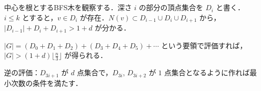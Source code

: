 \subsection{}
中心を根とするBFS木を観察する．深さ $i$ の部分の頂点集合を $D_i$ と書く．
$i \leq k$ とすると，$v\in D_i$ が存在．$N(v) \subset D_{i-1}\cup D_i\cup D_{i+1}$ から，
$|D_{i-1}| + D_i + D_{i+1} > 1 + d$ が分かる．

$|G| = (D_0+D_1+D_2) + (D_3+D_4+D_5)+\cdots$ という要領で評価すれば，$|G| > (1+d)\lfloor\frac{n}{3}\rfloor$ が得られる．

逆の評価：$D_{3i+1}$ が $d$ 点集合で，$D_{3i}$, $D_{3i+2}$ が $1$ 点集合となるように作れば最小次数の条件を満たす．